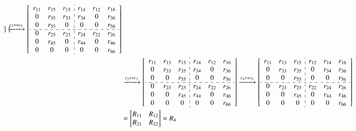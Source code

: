 \documentclass[1p]{elsarticle}
\numberwithin{equation}{section}
\begin{document}
\begin{align*}
\begin{bmatrix}
\end{bmatrix}
\xrightarrow{c_{2} \leftrightarrow c_{5}}
\begin{bmatrix}
\begin{array}{ccc:ccc}
 r_{11} & r_{15} & r_{13} & r_{14}  & r_{12} & r_{16}\\
 0      & r_{35} & r_{33} & r_{34}  & 0      & r_{36}\\
 0      & r_{55} & 0      & 0       & 0      & r_{56}\\
 \cdashline{1-6}
 0      & r_{25} & r_{23} & r_{24}  & r_{22} & r_{26}\\
 0      & r_{45} & 0      & r_{44}  & 0      & r_{46}\\
 0      & 0      & 0      & 0       & 0      & r_{66}\\
\end{array}
\end{bmatrix} \\
& \xrightarrow{c_{2} \leftrightarrow c_{3}}
\begin{bmatrix}
\begin{array}{ccc:ccc}
 r_{11} & r_{13} & r_{15} & r_{14}  & r_{12} & r_{16}\\
 0      & r_{33} & r_{35} & r_{34}  & 0      & r_{36}\\
 0      & 0      & r_{55} & 0       & 0      & r_{56}\\
 \cdashline{1-6}
 0      & r_{23} & r_{25} & r_{24}  & r_{22} & r_{26}\\
 0      & 0      & r_{45} & r_{44}  & 0      & r_{46}\\
 0      & 0      & 0      & 0       & 0      & r_{66}\\
\end{array}
\end{bmatrix}
\xrightarrow{c_{4} \leftrightarrow c_{5}}
\begin{bmatrix}
\begin{array}{ccc:ccc}
 r_{11} & r_{13} & r_{15} & r_{12} & r_{14} & r_{16}\\
 0      & r_{33} & r_{35} & 0      & r_{34} & r_{36}\\
 0      & 0      & r_{55} & 0      & 0      & r_{56}\\
 \cdashline{1-6}
0 & r_{23} & r_{25} & r_{22} & r_{24} & r_{26}\\
 0      & 0 & r_{45} & 0      & r_{44} & r_{46}\\
 0      & 0      & 0 & 0      & 0      & r_{66}\\
\end{array}
\end{bmatrix} \\
&=\begin{bmatrix}
    R_{11} & R_{12}\\R_{21} & R_{22}
\end{bmatrix} = R_4
\end{align*}
\end{document}
